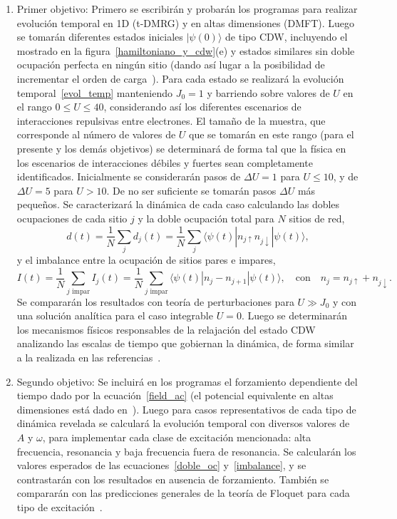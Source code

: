 \documentclass[a4paper,10pt]{article}
\begin{document}
\begin{enumerate}
\item Primer objetivo: Primero se escribir\'an y probar\'an los programas para realizar evoluci\'on temporal en 1D (t-DMRG) y en altas dimensiones (DMFT). Luego se tomar\'an diferentes estados iniciales $|\psi(0)\rangle$ de tipo CDW, incluyendo el mostrado en la figura~\ref{hamiltoniano_y_cdw}(e) y estados similares sin doble ocupaci\'on perfecta en ning\'un sitio (dando as\'i lugar a la posibilidad de incrementar el orden de carga~\cite{singer2016prl}). Para cada estado se realizar\'a la evoluci\'on temporal~\eqref{evol_temp} manteniendo $J_0=1$ y barriendo sobre valores de $U$ en el rango $0\leq U\leq40$, considerando as\'i los diferentes escenarios de interacciones repulsivas entre electrones. El tama\~no de la muestra, que corresponde al n\'umero de valores de $U$ que se tomar\'an en este rango (para el presente y los dem\'as objetivos) se determinar\'a de forma tal que la f\'isica en los escenarios de interacciones d\'ebiles y fuertes sean completamente identificados. Inicialmente se considerar\'an pasos de $\Delta U=1$ para $U\leq10$, y de $\Delta U=5$ para $U>10$. De no ser suficiente se tomar\'an pasos $\Delta U$ m\'as peque\~nos. Se caracterizar\'a la din\'amica de cada caso calculando las dobles ocupaciones de cada sitio $j$ y la doble ocupaci\'on total para $N$ sitios de red, 
\begin{equation} \label{doble_oc}
d(t)=\frac{1}{N}\sum_jd_j(t)=\frac{1}{N}\sum_j\langle\psi(t)|n_{j\uparrow}n_{j\downarrow}|\psi(t)\rangle,
\end{equation}
y el imbalance entre la ocupaci\'on de sitios pares e impares,
\begin{equation} \label{imbalance}
I(t)=\frac{1}{N}\sum_{j\text{ impar}}I_j(t)=\frac{1}{N}\sum_{j\text{ impar}}\langle\psi(t)|n_{j}-n_{j+1}|\psi(t)\rangle,\quad\text{con}\quad n_j=n_{j\uparrow}+n_{j\downarrow}.
\end{equation}
Se comparar\'an los resultados con teor\'ia de perturbaciones para $U\gg J_0$ y con una soluci\'on anal\'itica para el caso integrable $U=0$. Luego se determinar\'an los mecanismos f\'isicos responsables de la relajaci\'on del estado CDW analizando las escalas de tiempo que gobiernan la din\'amica, de forma similar a la realizada en las referencias~\cite{balzer2015prx,nosotros2017driven,heidrich_meisner2015pra}. 

\item Segundo objetivo: Se incluir\'a en los programas el forzamiento dependiente del tiempo dado por la ecuaci\'on~\eqref{field_ac} (el potencial equivalente en altas dimensiones est\'a dado en~\cite{nosotros2017driven}). Luego para casos representativos de cada tipo de din\'amica revelada se calcular\'a la evoluci\'on temporal con diversos valores de $A$ y $\omega$, para implementar cada clase de excitaci\'on mencionada: alta frecuencia, resonancia y baja frecuencia fuera de resonancia. Se calcular\'an los valores esperados de las ecuaciones~\eqref{doble_oc} y~\eqref{imbalance}, y se contrastar\'an con los resultados en ausencia de forzamiento. Tambi\'en se comparar\'an con las predicciones generales de la teor\'ia de Floquet para cada tipo de excitaci\'on~\cite{bukov2016prl,tsuji2011prl,mentink2015nat}.


\end{enumerate}
\end{document}
